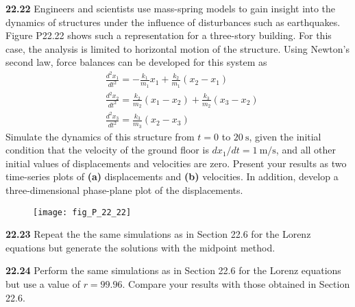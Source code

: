 \begin{multicols}{2}
    \noindent\textbf{22.22} Engineers and scientists use mass-spring models to gain insight into the dynamics of structures under the influence of disturbances such as earthquakes. Figure P22.22 shows such a representation for a three-story building. For this case, the analysis is limited to horizontal motion of the structure. Using Newton's second law, force balances can be developed for this system as
    $$
    \begin{aligned}
    &\frac{d^{2} x_{1}}{d t^{2}}=-\frac{k_{1}}{m_{1}} x_{1}+\frac{k_{2}}{m_{1}}\left(x_{2}-x_{1}\right) \\
    &\frac{d^{2} x_{2}}{d t^{2}}=\frac{k_{2}}{m_{2}}\left(x_{1}-x_{2}\right)+\frac{k_{3}}{m_{2}}\left(x_{3}-x_{2}\right) \\
    &\frac{d^{2} x_{3}}{d t^{2}}=\frac{k_{3}}{m_{3}}\left(x_{2}-x_{3}\right)
    \end{aligned}
    $$
    Simulate the dynamics of this structure from $t=0$ to $20 \mathrm{~s}$, given the initial condition that the velocity of the ground floor is $d x_{1} / d t=1 \mathrm{~m} / \mathrm{s}$, and all other initial values of displacements and velocities are zero. Present your results as two time-series plots of \textbf{(a)} displacements and \textbf{(b)} velocities. In addition, develop a     three-dimensional phase-plane plot of the displacements.
    
    \begin{figure}[H]
        \centering
        \texttt{[image: fig\_P\_22\_22]}
        \caption{\textsf{}}
        \label{fig:fig_P_22_22}
    \end{figure}\vspace{2mm}

    \noindent\textbf{22.23} Repeat the the same simulations as in Section 22.6
    for the Lorenz equations but generate the solutions with the
    midpoint method.\vspace{2mm}

    \noindent\textbf{22.24} Perform the same simulations as in Section 22.6 for
    the Lorenz equations but use a value of $r = 99.96$. Compare
    your results with those obtained in Section 22.6.\vspace{2mm}
    \end{multicols}





